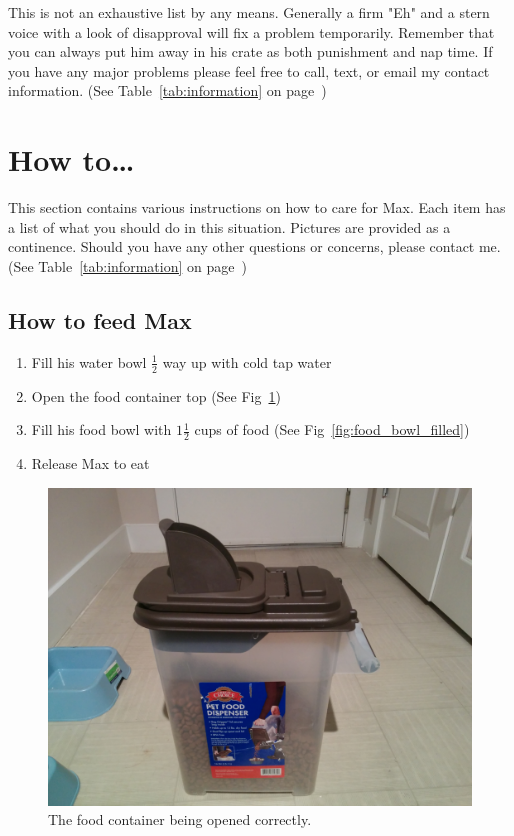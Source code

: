 \documentclass[pdftex,12pt]{article}
\begin{document}
\bigskip

This is not an exhaustive list by any means. Generally a firm "Eh" and a stern
voice with a look of disapproval will fix a problem temporarily. Remember that
you can always put him away in his crate as both punishment and nap time. If you
have any major problems please feel free to call, text, or email my contact
information. (See Table~\ref{tab:information} on page~\pageref{tab:information})

\newpage
\section{How to\ldots}

This section contains various instructions on how to care for Max. Each item has
a list of what you should do in this situation. Pictures are provided as a
continence. Should you have any other questions or concerns, please contact me.
(See Table~\ref{tab:information} on page~\pageref{tab:information})

\subsection{How to feed Max}
\begin{enumerate}\label{itm:how_to_feed}
    \item Fill his water bowl $\frac{1}{2}$ way up with cold tap water
    \item Open the food container top (See Fig~\ref{fig:food_container_open})
    \item Fill his food bowl with $1 \frac{1}{2}$ cups of food (See Fig~\ref{fig:food_bowl_filled})
    \item Release Max to eat
\end{enumerate}

\bigskip

\begin{figure}[h!]
    \centering
    \includegraphics[width=.35\textwidth]{./images/how_to/feed_max/food_container_open.jpg}
    \caption{The food container being opened correctly.}
    \label{fig:food_container_open}
\end{figure}
\end{document}
